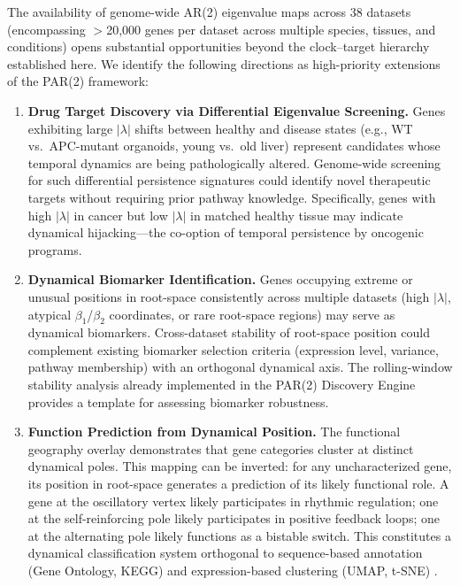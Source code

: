 \documentclass[11pt,letterpaper]{article}
\begin{document}
The availability of genome-wide AR(2) eigenvalue maps across 38 datasets (encompassing $>$20,000 genes per dataset across multiple species, tissues, and conditions) opens substantial opportunities beyond the clock--target hierarchy established here. We identify the following directions as high-priority extensions of the PAR(2) framework:

\begin{enumerate}[leftmargin=*, label=\textbf{\arabic*.}]

\item \textbf{Drug Target Discovery via Differential Eigenvalue Screening.}
Genes exhibiting large $|\lambda|$ shifts between healthy and disease states (e.g., WT vs.\ APC-mutant organoids, young vs.\ old liver) represent candidates whose temporal dynamics are being pathologically altered. Genome-wide screening for such differential persistence signatures could identify novel therapeutic targets without requiring prior pathway knowledge. Specifically, genes with high $|\lambda|$ in cancer but low $|\lambda|$ in matched healthy tissue may indicate dynamical hijacking---the co-option of temporal persistence by oncogenic programs.

\item \textbf{Dynamical Biomarker Identification.}
Genes occupying extreme or unusual positions in root-space consistently across multiple datasets (high $|\lambda|$, atypical $\beta_1$/$\beta_2$ coordinates, or rare root-space regions) may serve as dynamical biomarkers. Cross-dataset stability of root-space position could complement existing biomarker selection criteria (expression level, variance, pathway membership) with an orthogonal dynamical axis. The rolling-window stability analysis already implemented in the PAR(2) Discovery Engine provides a template for assessing biomarker robustness.

\item \textbf{Function Prediction from Dynamical Position.}
The functional geography overlay demonstrates that gene categories cluster at distinct dynamical poles. This mapping can be inverted: for any uncharacterized gene, its position in root-space generates a prediction of its likely functional role. A gene at the oscillatory vertex likely participates in rhythmic regulation; one at the self-reinforcing pole likely participates in positive feedback loops; one at the alternating pole likely functions as a bistable switch. This constitutes a dynamical classification system orthogonal to sequence-based annotation (Gene Ontology, KEGG) and expression-based clustering (UMAP, t-SNE) \citep{vandermaaten2008}.


\end{enumerate}
\end{document}
